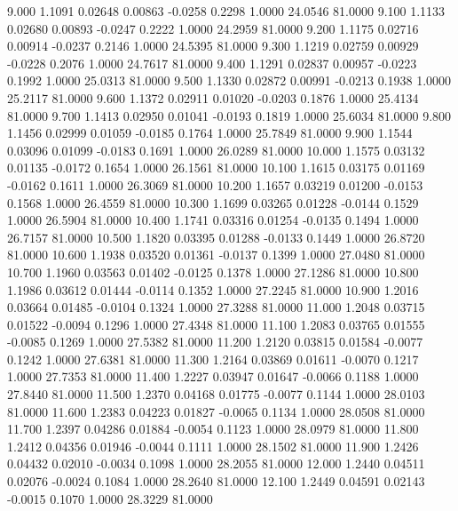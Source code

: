    9.000   1.1091   0.02648   0.00863  -0.0258   0.2298   1.0000  24.0546  81.0000
   9.100   1.1133   0.02680   0.00893  -0.0247   0.2222   1.0000  24.2959  81.0000
   9.200   1.1175   0.02716   0.00914  -0.0237   0.2146   1.0000  24.5395  81.0000
   9.300   1.1219   0.02759   0.00929  -0.0228   0.2076   1.0000  24.7617  81.0000
   9.400   1.1291   0.02837   0.00957  -0.0223   0.1992   1.0000  25.0313  81.0000
   9.500   1.1330   0.02872   0.00991  -0.0213   0.1938   1.0000  25.2117  81.0000
   9.600   1.1372   0.02911   0.01020  -0.0203   0.1876   1.0000  25.4134  81.0000
   9.700   1.1413   0.02950   0.01041  -0.0193   0.1819   1.0000  25.6034  81.0000
   9.800   1.1456   0.02999   0.01059  -0.0185   0.1764   1.0000  25.7849  81.0000
   9.900   1.1544   0.03096   0.01099  -0.0183   0.1691   1.0000  26.0289  81.0000
  10.000   1.1575   0.03132   0.01135  -0.0172   0.1654   1.0000  26.1561  81.0000
  10.100   1.1615   0.03175   0.01169  -0.0162   0.1611   1.0000  26.3069  81.0000
  10.200   1.1657   0.03219   0.01200  -0.0153   0.1568   1.0000  26.4559  81.0000
  10.300   1.1699   0.03265   0.01228  -0.0144   0.1529   1.0000  26.5904  81.0000
  10.400   1.1741   0.03316   0.01254  -0.0135   0.1494   1.0000  26.7157  81.0000
  10.500   1.1820   0.03395   0.01288  -0.0133   0.1449   1.0000  26.8720  81.0000
  10.600   1.1938   0.03520   0.01361  -0.0137   0.1399   1.0000  27.0480  81.0000
  10.700   1.1960   0.03563   0.01402  -0.0125   0.1378   1.0000  27.1286  81.0000
  10.800   1.1986   0.03612   0.01444  -0.0114   0.1352   1.0000  27.2245  81.0000
  10.900   1.2016   0.03664   0.01485  -0.0104   0.1324   1.0000  27.3288  81.0000
  11.000   1.2048   0.03715   0.01522  -0.0094   0.1296   1.0000  27.4348  81.0000
  11.100   1.2083   0.03765   0.01555  -0.0085   0.1269   1.0000  27.5382  81.0000
  11.200   1.2120   0.03815   0.01584  -0.0077   0.1242   1.0000  27.6381  81.0000
  11.300   1.2164   0.03869   0.01611  -0.0070   0.1217   1.0000  27.7353  81.0000
  11.400   1.2227   0.03947   0.01647  -0.0066   0.1188   1.0000  27.8440  81.0000
  11.500   1.2370   0.04168   0.01775  -0.0077   0.1144   1.0000  28.0103  81.0000
  11.600   1.2383   0.04223   0.01827  -0.0065   0.1134   1.0000  28.0508  81.0000
  11.700   1.2397   0.04286   0.01884  -0.0054   0.1123   1.0000  28.0979  81.0000
  11.800   1.2412   0.04356   0.01946  -0.0044   0.1111   1.0000  28.1502  81.0000
  11.900   1.2426   0.04432   0.02010  -0.0034   0.1098   1.0000  28.2055  81.0000
  12.000   1.2440   0.04511   0.02076  -0.0024   0.1084   1.0000  28.2640  81.0000
  12.100   1.2449   0.04591   0.02143  -0.0015   0.1070   1.0000  28.3229  81.0000
